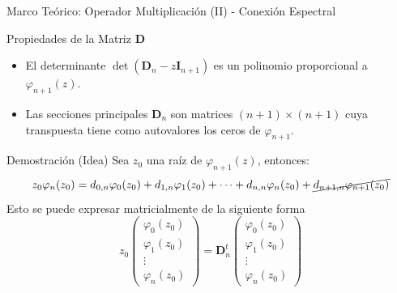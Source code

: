 \begin{frame}{Marco Teórico: Operador Multiplicación (II) - Conexión Espectral}
	\footnotesize
	\begin{block}{\footnotesize Propiedades de la Matriz $\mathbf{D}$}
		\begin{itemize}
			\item El determinante $\det(\mathbf{D}_n - z\mathbf{I}_{n+1})$ es un polinomio proporcional a $\varphi_{n+1}(z)$.
			\item Las secciones principales $\mathbf{D}_n$ son matrices $(n+1)\times(n+1)$ cuya transpuesta tiene como autovalores los ceros de $\varphi_{n+1}$.
		\end{itemize}
	\end{block}
	\begin{block}{\footnotesize Demostración (Idea)}
		Sea $z_0$ una raíz de $\varphi_{n+1}(z)$, entonces:
		$$
			z_0\varphi_n(z_0)= d_{0,n}\varphi_0(z_0)+d_{1,n}\varphi_1(z_0)+\dots+d_{n,n}\varphi_n(z_0)+\cancel{d_{n+1,n}\varphi_{n+1}(z_0)}
		$$
		\noindent Esto se puede expresar matricialmente de la siguiente forma
		$$
			z_0\begin{pmatrix} \varphi_0(z_0) \\ \varphi_1(z_0) \\  \vdots \\ \varphi_n(z_0) \end{pmatrix} = \mathbf{D}^{t}_n \begin{pmatrix} \varphi_0(z_0) \\ \varphi_1(z_0) \\  \vdots \\ \varphi_n(z_0) \end{pmatrix}
		$$
	\end{block}
\end{frame}

